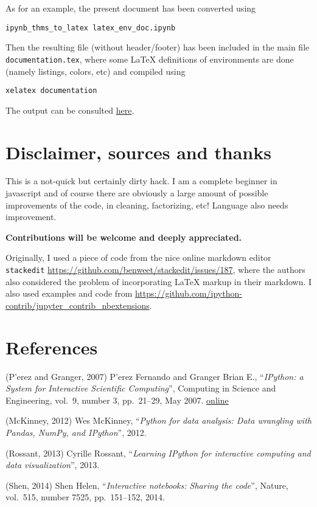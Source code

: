 \begin{example}
As for an example, the present document has been converted using

\begin{verbatim}
ipynb_thms_to_latex latex_env_doc.ipynb
\end{verbatim}

Then the resulting file (without header/footer) has been included in the
main file \texttt{documentation.tex}, where some LaTeX definitions of
environments are done (namely listings, colors, etc) and compiled using

\begin{verbatim}
xelatex documentation
\end{verbatim}

The output can be consulted \href{documentation.pdf}{here}.
\end{example}

    \section{Disclaimer, sources and
thanks}\label{disclaimer-sources-and-thanks}

    This is a not-quick but certainly dirty hack. I am a complete beginner
in javascript and of course there are obviously a large amount of
possible improvements of the code, in cleaning, factorizing, etc!
Language also needs improvement.

\textbf{Contributions will be welcome and deeply appreciated.}

Originally, I used a piece of code from the nice online markdown editor
\texttt{stackedit}
\url{https://github.com/benweet/stackedit/issues/187}, where the authors
also considered the problem of incorporating LaTeX markup in their
markdown. I also used examples and code from
\url{https://github.com/ipython-contrib/jupyter_contrib_nbextensions}.

    \section{References}\label{references}

(P'erez and Granger, 2007) P'erez Fernando and Granger Brian E.,
``\emph{IPython: a System for Interactive Scientific Computing}'',
Computing in Science and Engineering, vol.~9, number 3, pp.~21--29, May
2007. \href{http://ipython.org}{online}

(McKinney, 2012) Wes McKinney, ``\emph{Python for data analysis: Data
wrangling with Pandas, NumPy, and IPython}'', 2012.

(Rossant, 2013) Cyrille Rossant, ``\emph{Learning IPython for
interactive computing and data visualization}'', 2013.

(Shen, 2014) Shen Helen, ``\emph{Interactive notebooks: Sharing the
code}'', Nature, vol.~515, number 7525, pp.~151--152, 2014.


    
    
%
%

    
    